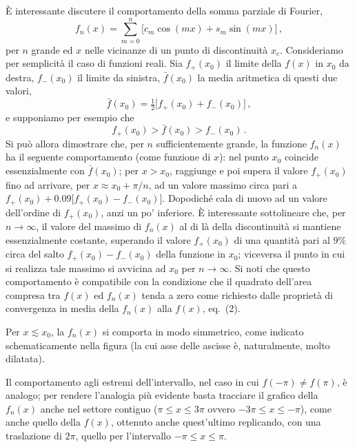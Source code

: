 \documentclass[11pt, a4paper]{book}
\numberwithin{equation}{section}
\begin{document}
È interessante discutere il comportamento della somma parziale di Fourier,
\begin{equation}
  f_n(x) = \sum_{m=0}^{n}\bigl[c_m\cos(mx)+s_m\sin(mx)\bigr]\,, \tag{10}
\end{equation}
per $n$ grande ed $x$ nelle vicinanze di un punto di discontinuità $x_c$. Consideriamo per semplicità il caso di funzioni reali. Sia $f_+(x_0)$ il limite della $f(x)$ in $x_0$ da destra, $f_-(x_0)$ il limite da sinistra, $\bar{f}(x_0)$ la media aritmetica di questi due valori,
\begin{equation}
  \bar{f}(x_0) = \tfrac{1}{2}\bigl[f_+(x_0)+f_-(x_0)\bigr]\,, \tag{11}
\end{equation}
e supponiamo per esempio che
\begin{equation}
  f_+(x_0) > \bar{f}(x_0) > f_-(x_0)\,. \tag{12}
\end{equation}
Si può allora dimostrare che, per $n$ sufficientemente grande, la funzione $f_n(x)$ ha il seguente comportamento (come funzione di $x$): nel punto $x_0$ coincide essenzialmente con $\bar{f}(x_0)$; per $x > x_0$, raggiunge e poi supera il valore $f_+(x_0)$ fino ad arrivare, per $x \approx x_0 + \pi/n$, ad un valore massimo circa pari a $f_+(x_0) + 0.09\bigl[f_+(x_0)-f_-(x_0)\bigr]$. Dopodiché cala di nuovo ad un valore dell'ordine di $f_+(x_0)$, anzi un po' inferiore. È interessante sottolineare che, per $n\to\infty$, il valore del massimo di $f_n(x)$ al di là della discontinuità si mantiene essenzialmente costante, superando il valore $f_+(x_0)$ di una quantità pari al $9\%$ circa del salto $f_+(x_0)-f_-(x_0)$ della funzione in $x_0$; viceversa il punto in cui si realizza tale massimo si avvicina ad $x_0$ per $n\to\infty$. Si noti che questo comportamento è compatibile con la condizione che il quadrato dell'area compresa tra $f(x)$ ed $f_n(x)$ tenda a zero come richiesto dalle proprietà di convergenza in media della $f_n(x)$ alla $f(x)$, eq.\ (2).


Per $x \lesssim x_0$, la $f_n(x)$ si comporta in modo simmetrico, come indicato schematicamente nella figura (la cui asse delle ascisse è, naturalmente, molto dilatata).

Il comportamento agli estremi dell'intervallo, nel caso in cui $f(-\pi) \neq f(\pi)$, è analogo; per rendere l'analogia più evidente basta tracciare il grafico della $f_n(x)$ anche nel settore contiguo ($\pi \leq x \leq 3\pi$ ovvero $-3\pi \leq x \leq -\pi$), come anche quello della $f(x)$, ottenuto anche quest'ultimo replicando, con una traslazione di $2\pi$, quello per l'intervallo $-\pi \leq x \leq \pi$.
\end{document}
